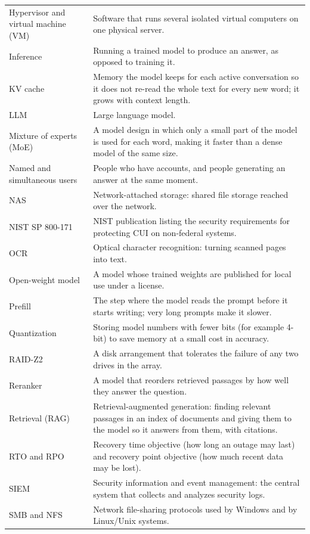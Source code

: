 {\begin{xltabular}{\textwidth}{@{}Y{0.55} Y{1.45}@{}}
  Hypervisor and virtual machine (VM) & Software that runs several isolated virtual computers on one physical server. \\
  Inference & Running a trained model to produce an answer, as opposed to training it. \\
  KV cache & Memory the model keeps for each active conversation so it does not re-read the whole text for every new word; it grows with context length. \\
  LLM & Large language model. \\
  Mixture of experts (MoE) & A model design in which only a small part of the model is used for each word, making it faster than a dense model of the same size. \\
  Named and simultaneous users & People who have accounts, and people generating an answer at the same moment. \\
  NAS & Network-attached storage: shared file storage reached over the network. \\
  NIST SP 800-171 & NIST publication listing the security requirements for protecting CUI on non-federal systems. \\
  OCR & Optical character recognition: turning scanned pages into text. \\
  Open-weight model & A model whose trained weights are published for local use under a license. \\
  Prefill & The step where the model reads the prompt before it starts writing; very long prompts make it slower. \\
  Quantization & Storing model numbers with fewer bits (for example 4-bit) to save memory at a small cost in accuracy. \\
  RAID-Z2 & A disk arrangement that tolerates the failure of any two drives in the array. \\
  Reranker & A model that reorders retrieved passages by how well they answer the question. \\
  Retrieval (RAG) & Retrieval-augmented generation: finding relevant passages in an index of documents and giving them to the model so it answers from them, with citations. \\
  RTO and RPO & Recovery time objective (how long an outage may last) and recovery point objective (how much recent data may be lost). \\
  SIEM & Security information and event management: the central system that collects and analyzes security logs. \\
  SMB and NFS & Network file-sharing protocols used by Windows and by Linux/Unix systems. \\

\end{xltabular}}
